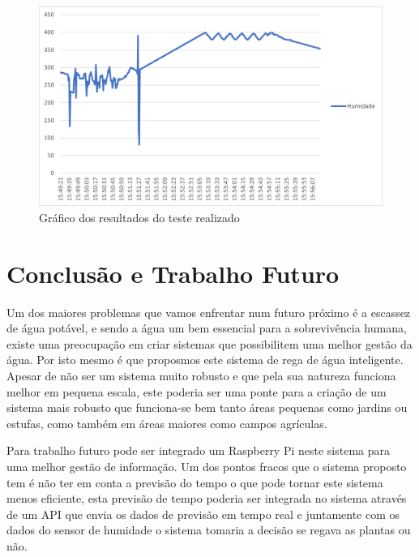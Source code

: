 \documentclass[conference]{IEEEtran}
\begin{document}
\begin{figure}
    \centering
    \includegraphics[scale=0.5]{humidity-test-graph.png}
    \caption{Gráfico dos resultados do teste realizado}
    \label{fig:graphic}
\end{figure}

\section{Conclusão e Trabalho Futuro}

Um dos maiores problemas que vamos enfrentar num futuro próximo é a escassez de água potável,
e sendo a água um bem essencial para a sobrevivência humana, existe uma preocupação 
em criar sistemas que possibilitem uma melhor gestão da água. Por isto mesmo 
é que proposmos este sistema de rega de água inteligente. Apesar de não ser um 
sistema muito robusto e que pela sua natureza funciona melhor em pequena escala, este 
poderia ser uma ponte para a criação de um sistema mais robusto que funciona-se bem 
tanto áreas pequenas como jardins ou estufas, como também em áreas maiores como campos agrículas.

Para trabalho futuro pode ser integrado um Raspberry Pi neste sistema para uma melhor 
gestão de informação. Um dos pontos fracos que o sistema proposto tem é não 
ter em conta a previsão do tempo o que pode tornar este sistema menos eficiente, 
esta previsão de tempo poderia ser integrada no sistema através de um API que 
envia os dados de previsão em tempo real e juntamente com os dados do sensor de 
humidade o sistema tomaria a decisão se regava as plantas ou não.



\end{document}
